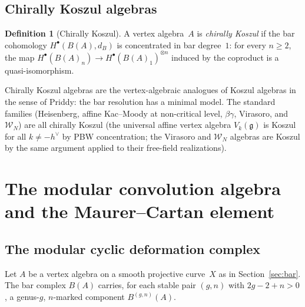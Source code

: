 \documentclass[11pt]{article}
\theoremstyle{plain}
\theoremstyle{definition}
\newtheorem{definition}[theorem]{Definition}
\theoremstyle{remark}
\newcommand{\fg}{\mathfrak{g}}
\newcommand{\cW}{\mathcal{W}}
\begin{document}
\subsection{Chirally Koszul algebras}

\begin{definition}[Chirally Koszul]
\label{def:chirally-koszul}
A vertex algebra~$A$ is \emph{chirally Koszul} if the bar
cohomology $H^{\bullet}(B(A), d_B)$ is concentrated in bar
degree~$1$: for every $n \geq 2$, the map
$H^{\bullet}(B(A)_n) \to H^{\bullet}(B(A)_1)^{\otimes n}$
induced by the coproduct is a quasi-isomorphism.
\end{definition}

Chirally Koszul algebras are the vertex-algebraic analogues
of Koszul algebras in the sense of Priddy: the bar resolution
has a minimal model. The standard families (Heisenberg,
affine Kac--Moody at non-critical level, $\beta\gamma$,
Virasoro, and $\cW_N$) are all chirally Koszul
(the universal affine vertex algebra $V_k(\fg)$ is Koszul for
all $k \neq -h^\vee$ by PBW concentration; the Virasoro
and $\cW_N$ algebras are Koszul by the same argument
applied to their free-field realizations).

\section{The modular convolution algebra and the Maurer--Cartan element}
\label{sec:mc}

\subsection{The modular cyclic deformation complex}

Let $A$ be a vertex algebra on a smooth projective curve~$X$
as in Section~\ref{sec:bar}. The bar complex $B(A)$ carries,
for each stable pair $(g,n)$ with $2g - 2 + n > 0$, a
genus-$g$, $n$-marked component $B^{(g,n)}(A)$.
\end{document}
